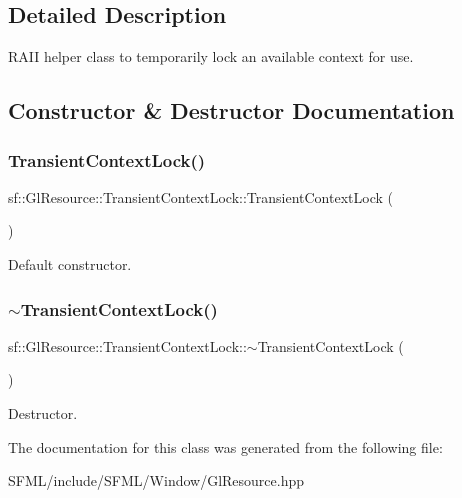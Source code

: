 \subsection{Detailed Description}
R\+A\+II helper class to temporarily lock an available context for use. 

\begin{DoxyVerb}\end{DoxyVerb}
 

\subsection{Constructor \& Destructor Documentation}
\mbox{\label{classsf_1_1_gl_resource_1_1_transient_context_lock_a6434ee8f0380c300b361be038f37123a}} 
\subsubsection{\texorpdfstring{TransientContextLock()}{TransientContextLock()}}
{\footnotesize\ttfamily sf\+::\+Gl\+Resource\+::\+Transient\+Context\+Lock\+::\+Transient\+Context\+Lock (\begin{DoxyParamCaption}{ }\end{DoxyParamCaption})}



Default constructor. 

\begin{DoxyVerb}\end{DoxyVerb}
 \mbox{\label{classsf_1_1_gl_resource_1_1_transient_context_lock_a169285281b252ac8d54523b0fcc4b814}} 
\subsubsection{\texorpdfstring{$\sim$TransientContextLock()}{~TransientContextLock()}}
{\footnotesize\ttfamily sf\+::\+Gl\+Resource\+::\+Transient\+Context\+Lock\+::$\sim$\+Transient\+Context\+Lock (\begin{DoxyParamCaption}{ }\end{DoxyParamCaption})}



Destructor. 

\begin{DoxyVerb}\end{DoxyVerb}
 

The documentation for this class was generated from the following file\+:\begin{DoxyCompactItemize}
\item 
S\+F\+M\+L/include/\+S\+F\+M\+L/\+Window/Gl\+Resource.\+hpp\end{DoxyCompactItemize}

